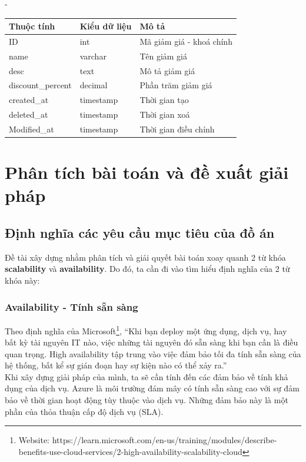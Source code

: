 \begin {list} {-}{}
\begin{itemize}
\begin{table}[h]
\begin{tabular}{|l|l|l|}
        \textbf{Thuộc tính} & \textbf{Kiểu dữ liệu} & \textbf{Mô tả}           \\ \hline
        ID                  & int                   & Mã giảm giá - khoá chính \\ \hline
        name                & varchar               & Tên giảm giá             \\ \hline
        desc                & text                  & Mô tả giảm giá           \\ \hline
        discount\_percent   & decimal               & Phần trăm giảm giá       \\ \hline
        created\_at         & timestamp             & Thời gian tạo            \\ \hline
        deleted\_at         & timestamp             & Thời gian xoá            \\ \hline
        Modified\_at        & timestamp             & Thời gian điều chỉnh     \\ \hline
        \end{tabular}
        \end{table}
\end{itemize}

\section{Phân tích bài toán và đề xuất giải pháp}
\subsection{Định nghĩa các yêu cầu mục tiêu của đồ án}
\noindent Đề tài xây dựng nhằm phân tích và giải quyết bài toán xoay quanh 2 từ khóa \textbf{scalability} và \textbf{availability}. Do đó, ta cần đi vào tìm hiểu định nghĩa của 2 từ khóa này:

\subsubsection{Availability - Tính sẵn sàng}
\noindent Theo định nghĩa của Microsoft\footnote{Website: https://learn.microsoft.com/en-us/training/modules/describe-benefits-use-cloud-services/2-high-availability-scalability-cloud}, “Khi bạn deploy một ứng dụng, dịch vụ, hay bất kỳ tài nguyên IT nào, việc những tài nguyên đó sẵn sàng khi bạn cần là điều quan trọng. High availability tập trung vào việc đảm bảo tối đa tính sẵn sàng của hệ thống, bất kể sự gián đoạn hay sự kiện nào có thể xảy ra.” \\[0.5cm]
\noindent Khi xây dựng giải pháp của mình, ta sẽ cần tính đến các đảm bảo về tính khả dụng của dịch vụ. Azure là môi trường đám mây có tính sẵn sàng cao với sự đảm bảo về thời gian hoạt động tùy thuộc vào dịch vụ. Những đảm bảo này là một phần của thỏa thuận cấp độ dịch vụ (SLA).


\end{list}
